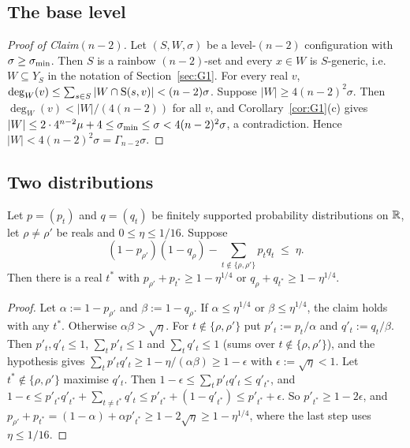 \subsection{The base level}

\begin{proof}[Proof of Claim$(n-2)$]
Let $(S,W,\sigma)$ be a level-$(n-2)$ configuration with $\sigma\ge\sigma_{\min}$. Then $S$ is a rainbow $(n-2)$-set and every
$x\in W$ is $S$-generic, i.e.\ $W\subseteq Y_S$ in the notation of Section~\ref{sec:G1}. For every real $v$,
$\deg_W(v)\le\sum_{s\in S}|W\cap\mathrm{S}(s,v)|<(n-2)\sigma$. Suppose $|W|\ge4(n-2)^2\sigma$. Then
$\deg_W(v)<|W|/(4(n-2))$ for all $v$, and Corollary~\ref{cor:G1}(c) gives
$|W|\le2\cdot4^{n-2}\mu+4\le\sigma_{\min}\le\sigma<4(n-2)^2\sigma$, a contradiction. Hence
$|W|<4(n-2)^2\sigma=\Gamma_{n-2}\sigma$.
\end{proof}

\subsection{Two distributions}

\begin{lemma}\label{lem:twodist}
Let $p=(p_t)$ and $q=(q_t)$ be finitely supported probability distributions on $\mathbb{R}$, let $\rho\ne\rho'$ be reals and
$0\le\eta\le1/16$. Suppose
\[
(1-p_{\rho'})(1-q_\rho)-\sum_{t\notin\{\rho,\rho'\}}p_tq_t\;\le\;\eta .
\]
Then there is a real $t^\ast$ with $p_{\rho'}+p_{t^\ast}\ge1-\eta^{1/4}$ or $q_\rho+q_{t^\ast}\ge1-\eta^{1/4}$.
\end{lemma}
\begin{proof}
Let $\alpha:=1-p_{\rho'}$ and $\beta:=1-q_\rho$. If $\alpha\le\eta^{1/4}$ or $\beta\le\eta^{1/4}$, the claim
holds with any $t^\ast$. Otherwise $\alpha\beta>\sqrt\eta$. For $t\notin\{\rho,\rho'\}$ put $p'_t:=p_t/\alpha$ and
$q'_t:=q_t/\beta$. Then $p'_t,q'_t\le1$, $\sum_tp'_t\le1$ and $\sum_tq'_t\le1$ (sums over $t\notin\{\rho,\rho'\}$),
and the hypothesis gives $\sum_tp'_tq'_t\ge1-\eta/(\alpha\beta)\ge1-\epsilon$ with $\epsilon:=\sqrt\eta<1$. Let
$t^\ast\notin\{\rho,\rho'\}$ maximise $q'_t$. Then $1-\epsilon\le\sum_tp'_tq'_t\le q'_{t^\ast}$, and
$1-\epsilon\le p'_{t^\ast}q'_{t^\ast}+\sum_{t\ne t^\ast}q'_t\le p'_{t^\ast}+(1-q'_{t^\ast})\le p'_{t^\ast}+\epsilon$.
So $p'_{t^\ast}\ge1-2\epsilon$, and $p_{\rho'}+p_{t^\ast}=(1-\alpha)+\alpha p'_{t^\ast}\ge1-2\sqrt\eta\ge1-\eta^{1/4}$,
where the last step uses $\eta\le1/16$.
\end{proof}

